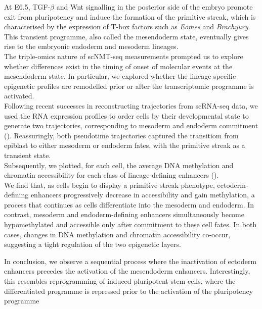 At E6.5, TGF-$\beta$ and Wnt signalling in the posterior side of the embryo promote exit from pluripotency and induce the formation of the primitive streak, which is characterised by the expression of T-box factors such as \textit{Eomes} and \textit{Brachyury}\cite{Tosci2019}. This transient programme, also called the mesendoderm state, eventually gives rise to the embryonic endoderm and mesoderm lineages. \\
The triple-omics nature of scNMT-seq measurements prompted us to explore whether differences exist in the timing of onset of molecular events at the mesendoderm state. In particular, we explored whether the lineage-specific epigenetic profiles are remodelled prior or after the transcriptomic programme is activated.\\
Following recent successes in reconstructing trajectories from scRNA-seq data, we used the RNA expression profiles to order cells by their developmental state to generate two trajectories, corresponding to mesoderm and endoderm commitment (). Reassuringly, both pseudotime trajectories captured the transitiom from epiblast to either mesoderm or endoderm fates, with the primitive streak as a transient state.\\
 Subsequently, we plotted, for each cell, the average DNA methylation and chromatin accessibility for each class of lineage-defining enhancers ().\\
We find that, as cells begin to display a primitive streak phenotype, ectoderm-defining enhancers progressively decrease in accessibility and gain methylation, a process that continues as cells differentiate into the mesoderm and endoderm. In contrast, mesoderm and endoderm-defining enhancers simultaneously become hypomethylated and accessible only after commitment to these cell fates. In both cases, changes in DNA methylation and chromatin accessibility co-occur, suggesting a tight regulation of the two epigenetic layers.

In conclusion, we observe a sequential process where the inactivation of ectoderm enhancers precedes the activation of the mesendoderm enhancers. Interestingly, this resembles reprogramming of induced pluripotent stem cells, where the differentiated programme is repressed prior to the activation of the pluripotency programme\cite{Papp2013}

